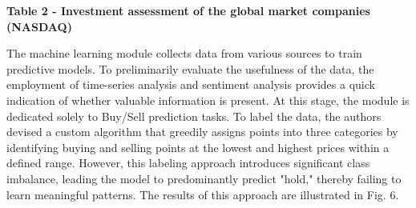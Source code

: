 {{\bfseries Table 2 - Investment assessment of the global market companies
(NASDAQ)}


The machine learning module collects data from various sources to train
predictive models. To preliminarily evaluate the usefulness of the data,
the employment of time-series analysis and sentiment analysis provides a
quick indication of whether valuable information is present. At this
stage, the module is dedicated solely to Buy/Sell prediction tasks. To
label the data, the authors devised a custom algorithm that greedily
assigns points into three categories by identifying buying and selling
points at the lowest and highest prices within a defined range. However,
this labeling approach introduces significant class imbalance, leading
the model to predominantly predict "hold," thereby failing to learn
meaningful patterns. The results of this approach are illustrated in
Fig. 6.

}
